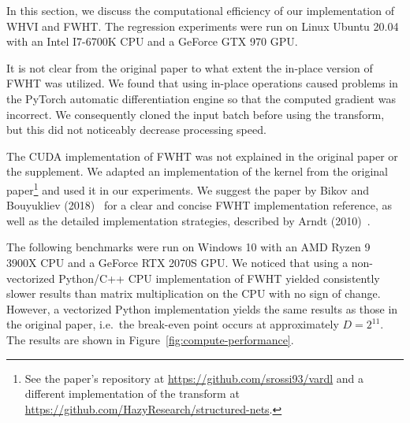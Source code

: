 
In this section, we discuss the computational efficiency of our implementation of WHVI and FWHT\@.
The regression experiments were run on Linux Ubuntu 20.04 with an Intel I7-6700K CPU and a GeForce GTX 970 GPU\@.

It is not clear from the original paper to what extent the in-place version of FWHT was utilized.
We found that using in-place operations caused problems in the PyTorch automatic differentiation engine so that the computed gradient was incorrect.
We consequently cloned the input batch before using the transform, but this did not noticeably decrease processing speed.

The CUDA implementation of FWHT was not explained in the original paper or the supplement.
We adapted an implementation of the kernel from the original paper\footnote{See the paper's repository at \url{https://github.com/srossi93/vardl} and a different implementation of the transform at \url{https://github.com/HazyResearch/structured-nets}.} and used it in our experiments.
We suggest the paper by Bikov and Bouyukliev (2018)~\cite{bikov2018parallel} for a clear and concise FWHT implementation reference, as well as the detailed implementation strategies, described by Arndt (2010)~\cite{arndt2010matters}.

The following benchmarks were run on Windows 10 with an AMD Ryzen 9 3900X CPU and a GeForce RTX 2070S GPU\@.
We noticed that using a non-vectorized Python/C++ CPU implementation of FWHT yielded consistently slower results than matrix multiplication on the CPU with no sign of change.
However, a vectorized Python implementation yields the same results as those in the original paper, i.e.\ the break-even point occurs at approximately $D = 2^{11}$.
The results are shown in Figure~\ref{fig:compute-performance}.


